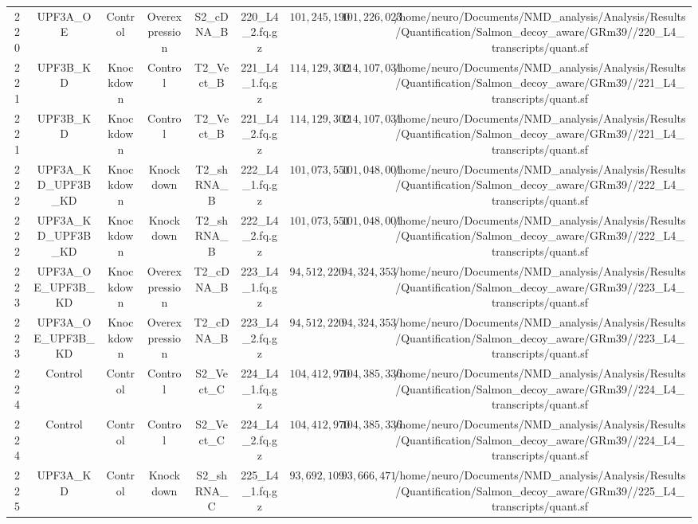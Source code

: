 \begin{table}[!htbp]
\begin{tabular}{@{\extracolsep{5pt}} ccccccccc}
220 & UPF3A\_OE & Control & Overexpression & S2\_cDNA\_B & 220\_L4\_2.fq.gz & $101,245,190$ & $101,226,023$ & /home/neuro/Documents/NMD\_analysis/Analysis/Results/Quantification/Salmon\_decoy\_aware/GRm39//220\_L4\_transcripts/quant.sf \\ 
221 & UPF3B\_KD & Knockdown & Control & T2\_Vect\_B & 221\_L4\_1.fq.gz & $114,129,302$ & $114,107,031$ & /home/neuro/Documents/NMD\_analysis/Analysis/Results/Quantification/Salmon\_decoy\_aware/GRm39//221\_L4\_transcripts/quant.sf \\ 
221 & UPF3B\_KD & Knockdown & Control & T2\_Vect\_B & 221\_L4\_2.fq.gz & $114,129,302$ & $114,107,031$ & /home/neuro/Documents/NMD\_analysis/Analysis/Results/Quantification/Salmon\_decoy\_aware/GRm39//221\_L4\_transcripts/quant.sf \\ 
222 & UPF3A\_KD\_UPF3B\_KD & Knockdown & Knockdown & T2\_shRNA\_B & 222\_L4\_1.fq.gz & $101,073,551$ & $101,048,001$ & /home/neuro/Documents/NMD\_analysis/Analysis/Results/Quantification/Salmon\_decoy\_aware/GRm39//222\_L4\_transcripts/quant.sf \\ 
222 & UPF3A\_KD\_UPF3B\_KD & Knockdown & Knockdown & T2\_shRNA\_B & 222\_L4\_2.fq.gz & $101,073,551$ & $101,048,001$ & /home/neuro/Documents/NMD\_analysis/Analysis/Results/Quantification/Salmon\_decoy\_aware/GRm39//222\_L4\_transcripts/quant.sf \\ 
223 & UPF3A\_OE\_UPF3B\_KD & Knockdown & Overexpression & T2\_cDNA\_B & 223\_L4\_1.fq.gz & $94,512,220$ & $94,324,353$ & /home/neuro/Documents/NMD\_analysis/Analysis/Results/Quantification/Salmon\_decoy\_aware/GRm39//223\_L4\_transcripts/quant.sf \\ 
223 & UPF3A\_OE\_UPF3B\_KD & Knockdown & Overexpression & T2\_cDNA\_B & 223\_L4\_2.fq.gz & $94,512,220$ & $94,324,353$ & /home/neuro/Documents/NMD\_analysis/Analysis/Results/Quantification/Salmon\_decoy\_aware/GRm39//223\_L4\_transcripts/quant.sf \\ 
224 & Control & Control & Control & S2\_Vect\_C & 224\_L4\_1.fq.gz & $104,412,970$ & $104,385,336$ & /home/neuro/Documents/NMD\_analysis/Analysis/Results/Quantification/Salmon\_decoy\_aware/GRm39//224\_L4\_transcripts/quant.sf \\ 
224 & Control & Control & Control & S2\_Vect\_C & 224\_L4\_2.fq.gz & $104,412,970$ & $104,385,336$ & /home/neuro/Documents/NMD\_analysis/Analysis/Results/Quantification/Salmon\_decoy\_aware/GRm39//224\_L4\_transcripts/quant.sf \\ 
225 & UPF3A\_KD & Control & Knockdown & S2\_shRNA\_C & 225\_L4\_1.fq.gz & $93,692,109$ & $93,666,471$ & /home/neuro/Documents/NMD\_analysis/Analysis/Results/Quantification/Salmon\_decoy\_aware/GRm39//225\_L4\_transcripts/quant.sf \\ 

\end{tabular}
\end{table}
